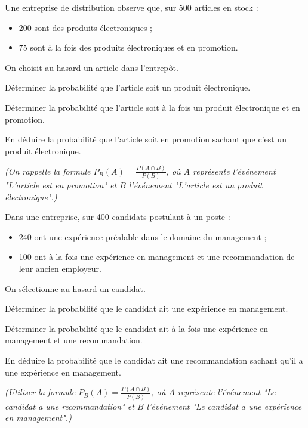 \documentclass[11pt]{article}
\begin{document}
\begin{exercice}
Une entreprise de distribution observe que, sur 500 articles en stock :
\begin{itemize}
    \item 200 sont des produits électroniques ;
    \item 75 sont à la fois des produits électroniques et en promotion.
\end{itemize}

On choisit au hasard un article dans l'entrepôt.

\begin{enu}
\item Déterminer la probabilité que l'article soit un produit électronique.
\item Déterminer la probabilité que l'article soit à la fois un produit électronique et en promotion.
\item En déduire la probabilité que l'article soit en promotion sachant que c'est un produit électronique.
\end{enu}
\textit{(On rappelle la formule \( P_B(A) = \frac{P(A \cap B)}{P(B)} \), où \( A \) représente l'événement "L'article est en promotion" et \( B \) l'événement "L'article est un produit électronique".)}
\end{exercice}

\begin{exercice}
Dans une entreprise, sur 400 candidats postulant à un poste :
\begin{itemize}
    \item 240 ont une expérience préalable dans le domaine du management ;
    \item 100 ont à la fois une expérience en management et une recommandation de leur ancien employeur.
\end{itemize}

On sélectionne au hasard un candidat.

\begin{enu}
\item Déterminer la probabilité que le candidat ait une expérience en management.
\item Déterminer la probabilité que le candidat ait à la fois une expérience en management et une recommandation.
\item En déduire la probabilité que le candidat ait une recommandation sachant qu'il a une expérience en management.
\end{enu}
\textit{(Utiliser la formule \( P_B(A) = \frac{P(A \cap B)}{P(B)} \), où \( A \) représente l'événement "Le candidat a une recommandation" et \( B \) l'événement "Le candidat a une expérience en management".)}
\end{exercice}
\end{document}
